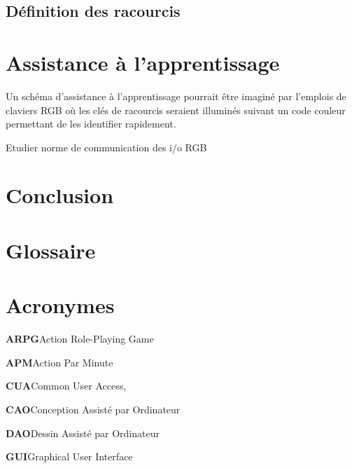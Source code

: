 \documentclass[a4paper,12pt]{article}
\begin{document}
\subsection{Définition des racourcis}
\label{sec:orgfaef367}
\section{Assistance à l'apprentissage}
\label{sec:org7250438}
Un schéma d'assistance à l'apprentissage pourrait être imaginé par l'emplois de claviers RGB où les clés de racourcis seraient illuminés suivant un code couleur permettant de les identifier rapidement.

Etudier norme de communication des i/o RGB
\section{Conclusion}
\label{sec:orgaa7a50d}

\section{Glossaire}
\label{sec:orge93319c}


\section{Acronymes}
\label{sec:org0e72a80}
\textbf{\hypertarget{gls-61}{ARPG}}\hspace*{1em}Action Role-Playing Game\hspace*{.5em}\pageref{gls-12-use-1}

\textbf{\hypertarget{gls-57}{APM}}\hspace*{1em}Action Par Minute\hspace*{.5em}\pageref{gls-10-use-1}

\textbf{\hypertarget{gls-113}{CUA}}\hspace*{1em}Common User Access\hspace*{.5em}\pageref{gls-1-use-1}, \pageref{gls-1-use-2}

\textbf{\hypertarget{gls-88}{CAO}}\hspace*{1em}Conception Assisté par Ordinateur\hspace*{.5em}\pageref{gls-5-use-1}

\textbf{\hypertarget{gls-115}{DAO}}\hspace*{1em}Dessin Assisté par Ordinateur\hspace*{.5em}\pageref{gls-6-use-1}

\textbf{\hypertarget{gls-178}{GUI}}\hspace*{1em}Graphical User Interface\hspace*{.5em}\pageref{gls-2-use-1}
\end{document}

